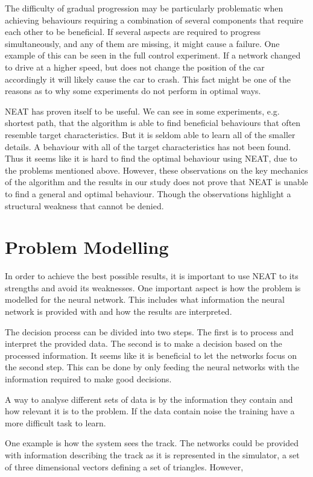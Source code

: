 The difficulty of gradual progression may be particularly problematic when achieving behaviours requiring a combination of several components that require each other to be beneficial. If several aspects are required to progress simultaneously, and any of them are missing, it might cause a failure. One example of this can be seen in the full control experiment. If a network changed to drive at a higher speed, but does not change the position of the car accordingly it will likely cause the car to crash. This fact might be one of the reasons as to why some experiments do not perform in optimal ways.

NEAT has proven itself to be useful. We can see in some experiments, e.g. shortest path, that the algorithm is able to find beneficial behaviours that often resemble target characteristics. But it is seldom able to learn all of the smaller details. A behaviour with all of the target characteristics has not been found. Thus it seems like it is hard to find the optimal behaviour using NEAT, due to the problems mentioned above. However, these observations on the key mechanics of the algorithm and the results in our study does not prove that NEAT is unable to find a general and optimal behaviour. Though the observations highlight a structural weakness that cannot be denied. 

\section{Problem Modelling}

In order to achieve the best possible results, it is important to use NEAT to its strengths and avoid its weaknesses. One important aspect is how the problem is modelled for the neural network. This includes what information the neural network is provided with and how the results are interpreted.  

The decision process can be divided into two steps. The first is to process and interpret the provided data. The second is to make a decision based on the processed information. It seems like it is beneficial to let the networks focus on the second step. This can be done by only feeding the neural networks with the information required to make good decisions. 


A way to analyse different sets of data is by the information they contain and how relevant it is to the problem. If the data contain noise the training have a more difficult task to learn.


One example is how the system sees the track. The networks could be provided with information describing the track as it is represented in the simulator, a set of three dimensional vectors defining a set of triangles. However, 



